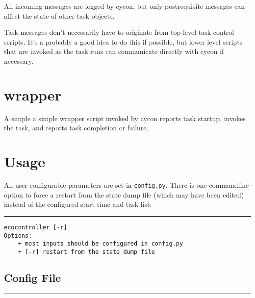 \documentclass[11pt,a4paper]{article}
\begin{document}
All incoming messages are logged by cycon, but only postrequisite
messages can affect the state of other task objects.

Task messages don't necessarily have to originate from top level task
control scripts. It's a probably a good idea to do this if possible, but
lower level scripts that are invoked as the task runs can communicate
directly with cycon if necessary.

\section{wrapper}

A simple a simple wrapper script invoked by cycon reports task
startup, invokes the task, and reports task completion or failure. 


\label{usage}
\section{Usage}

All user-configurable parameters are set in \verb#config.py#. There is
one commandline option to force a restart from the state dump file
(which may have been edited) instead of the configured start time and
task list:

\lstset{language=sh}

{\small

\noindent
\rule{5cm}{.2mm}
\begin{lstlisting}
ecocontroller [-r]
Options:
    + most inputs should be configured in config.py
    + [-r] restart from the state dump file
\end{lstlisting}
}

\lstset{language=Python}

\subsection{Config File}

{\small
\noindent
\rule{5cm}{.2mm}

}
\end{document}
